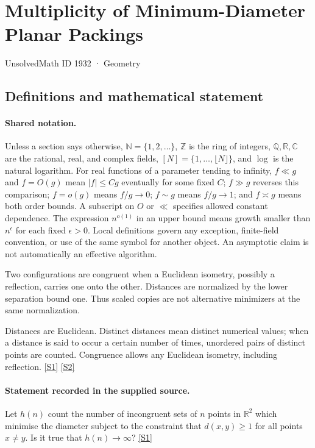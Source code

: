 \documentclass[11pt,a4paper]{article}
\newcommand{\N}{\mathbb{N}}
\newcommand{\Z}{\mathbb{Z}}
\newcommand{\Q}{\mathbb{Q}}
\newcommand{\R}{\mathbb{R}}
\newcommand{\C}{\mathbb{C}}
\newcommand{\sref}[2]{\hyperlink{source:#1:#2}{[S#2]}}
\begin{document}

\setcounter{section}{1931}

\section{Multiplicity of Minimum-Diameter Planar Packings}\label{1932}

{\small\sffamily UnsolvedMath ID 1932 · Geometry}

\subsection{Definitions and mathematical statement}

\paragraph{Shared notation.}Unless a section says otherwise, $\N=\{1,2,\ldots\}$,
$\Z$ is the ring of integers, $\Q,\R,\C$ are the rational, real, and complex
fields, $[N]=\{1,\ldots,\lfloor N\rfloor\}$, and $\log$ is the natural
logarithm. For real functions of a parameter tending to infinity,
$f\ll g$ and $f=O(g)$ mean $|f|\leq Cg$ eventually for some fixed $C$;
$f\gg g$ reverses this comparison; $f=o(g)$ means $f/g\to0$;
$f\sim g$ means $f/g\to1$; and $f\asymp g$ means both order bounds.
A subscript on $O$ or $\ll$ specifies allowed constant dependence.
The expression $n^{o(1)}$ in an upper bound means growth smaller than
$n^\epsilon$ for each fixed $\epsilon>0$. Local definitions govern any
exception, finite-field convention, or use of the same symbol for another
object. An asymptotic claim is not automatically an effective algorithm.



Two configurations are congruent when a Euclidean isometry, possibly a reflection, carries one onto the other. Distances are normalized by the lower separation bound one. Thus scaled copies are not alternative minimizers at the same normalization.

Distances are Euclidean. Distinct distances mean distinct numerical values; when a distance is said to occur a certain number of times, unordered pairs of distinct points are counted. Congruence allows any Euclidean isometry, including reflection. \sref{1932}{1} \sref{1932}{2}

\paragraph{Statement recorded in the supplied source.}
Let $h(n)$ count the number of incongruent sets of $n$ points in $\mathbb{R}^2$ which minimise the diameter subject to the constraint that $d(x,y)\geq 1$ for all points $x\neq y$. Is it true that $h(n)\to \infty$? \sref{1932}{1}
\end{document}
